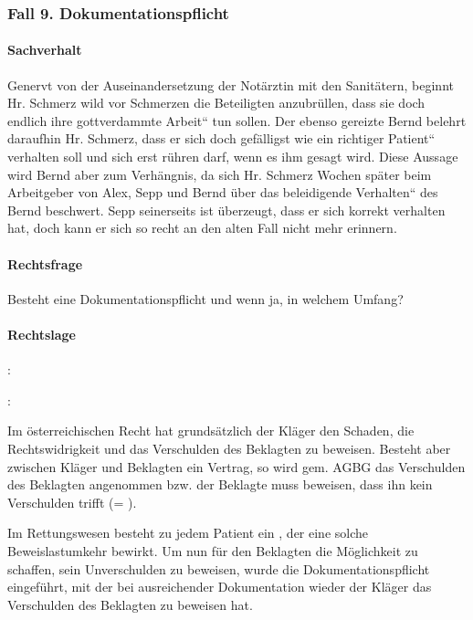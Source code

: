 \subsubsection{Fall 9. Dokumentationspflicht}

\paragraph*{Sachverhalt}

Genervt von der Auseinandersetzung der Notärztin mit den Sanitätern,
beginnt Hr. Schmerz wild vor Schmerzen die Beteiligten anzubr\"ullen,
dass sie doch endlich ihre {\quotedblbase}gottverdammte
Arbeit{\textquotedblleft} tun sollen. Der ebenso gereizte Bernd belehrt
daraufhin Hr. Schmerz, dass er sich doch gefälligst wie ein
{\quotedblbase}richtiger Patient{\textquotedblleft} verhalten soll und
sich erst r\"uhren darf, wenn es ihm gesagt wird. Diese Aussage wird
Bernd aber zum Verhängnis, da sich Hr. Schmerz Wochen später beim
Arbeitgeber von Alex, Sepp und Bernd \"uber das
{\quotedblbase}beleidigende Verhalten{\textquotedblleft} des Bernd
beschwert. Sepp seinerseits ist \"uberzeugt, dass er sich korrekt
verhalten hat, doch kann er sich so recht an den alten Fall nicht mehr
erinnern.

\paragraph*{Rechtsfrage}

Besteht eine Dokumentationspflicht und wenn ja, in welchem Umfang? 

\paragraph*{Rechtslage}

 :
{\quotedblbase}

:

Im \"osterreichischen Recht hat grundsätzlich der Kläger den
Schaden, die Rechtswidrigkeit und das Verschulden des Beklagten zu
beweisen. Besteht aber zwischen Kläger und Beklagten ein Vertrag, so
wird gem.  AGBG das Verschulden des Beklagten
angenommen bzw. der Beklagte muss beweisen, dass ihn kein Verschulden trifft (=
). 

Im Rettungswesen besteht zu jedem Patient ein , der eine
solche Beweislastumkehr bewirkt. Um nun f\"ur den Beklagten die
M\"oglichkeit zu schaffen, sein Unverschulden zu beweisen, wurde die
Dokumentationspflicht eingef\"uhrt, mit der bei ausreichender
Dokumentation wieder der Kläger das Verschulden des Beklagten zu
beweisen hat.

